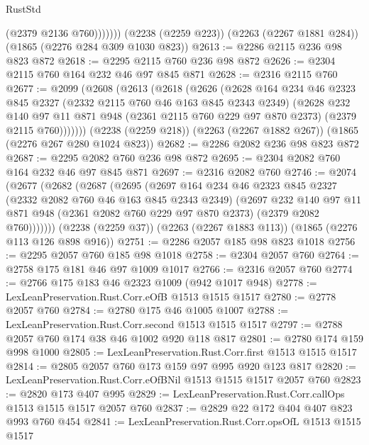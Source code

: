\begin{lexlean}{RustStd}
\begin{coremodule}
                (@2379 @2136 @760)))))))
    (@2238 (@2259 @223))
    (@2263 (@2267 @1881 @284))
    (@1865 (@2276 @284 @309 @1030 @823))
@2613 := @2286 @2115 @236 @98 @823 @872
@2618 := @2295 @2115 @760 @236 @98 @872
@2626 := @2304 @2115 @760 @164 @232 @46 @97 @845 @871
@2628 := @2316 @2115 @760
@2677 := @2099
    (@2608
      (@2613
        (@2618
          (@2626
            (@2628
              @164
              @234
              @46
              @2323
              @845
              @2327
              (@2332 @2115 @760 @46 @163 @845 @2343 @2349)
              (@2628
                @232
                @140
                @97
                @11
                @871
                @948
                (@2361 @2115 @760 @229 @97 @870 @2373)
                (@2379 @2115 @760)))))))
    (@2238 (@2259 @218))
    (@2263 (@2267 @1882 @267))
    (@1865 (@2276 @267 @280 @1024 @823))
@2682 := @2286 @2082 @236 @98 @823 @872
@2687 := @2295 @2082 @760 @236 @98 @872
@2695 := @2304 @2082 @760 @164 @232 @46 @97 @845 @871
@2697 := @2316 @2082 @760
@2746 := @2074
    (@2677
      (@2682
        (@2687
          (@2695
            (@2697
              @164
              @234
              @46
              @2323
              @845
              @2327
              (@2332 @2082 @760 @46 @163 @845 @2343 @2349)
              (@2697
                @232
                @140
                @97
                @11
                @871
                @948
                (@2361 @2082 @760 @229 @97 @870 @2373)
                (@2379 @2082 @760)))))))
    (@2238 (@2259 @37))
    (@2263 (@2267 @1883 @113))
    (@1865 (@2276 @113 @126 @898 @916))
@2751 := @2286 @2057 @185 @98 @823 @1018
@2756 := @2295 @2057 @760 @185 @98 @1018
@2758 := @2304 @2057 @760
@2764 := @2758 @175 @181 @46 @97 @1009 @1017
@2766 := @2316 @2057 @760
@2774 := @2766 @175 @183 @46 @2323 @1009 (@942 @1017 @948)
@2778 := LexLeanPreservation.Rust.Corr.eOfB @1513 @1515 @1517
@2780 := @2778 @2057 @760
@2784 := @2780 @175 @46 @1005 @1007
@2788 := LexLeanPreservation.Rust.Corr.second @1513 @1515 @1517
@2797 := @2788 @2057 @760 @174 @38 @46 @1002 @920 @118 @817
@2801 := @2780 @174 @159 @998 @1000
@2805 := LexLeanPreservation.Rust.Corr.first @1513 @1515 @1517
@2814 := @2805 @2057 @760 @173 @159 @97 @995 @920 @123 @817
@2820 := LexLeanPreservation.Rust.Corr.eOfBNil @1513 @1515 @1517 @2057 @760
@2823 := @2820 @173 @407 @995
@2829 := LexLeanPreservation.Rust.Corr.callOps @1513 @1515 @1517 @2057 @760
@2837 := @2829 @22 @172 @404 @407 @823 @993 @760 @454
@2841 := LexLeanPreservation.Rust.Corr.opsOfL @1513 @1515 @1517

\end{coremodule}
\end{lexlean}
